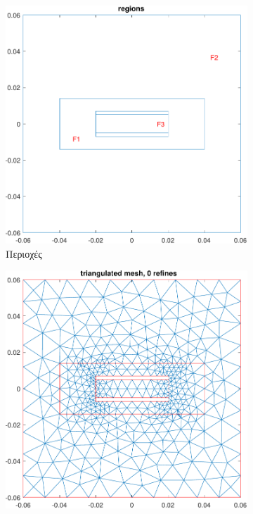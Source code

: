 \documentclass[10pt, letterpaper]{article}
\begin{document}
\begin{figure}[h!]
  \centering
  \begin{subfigure}[b]{0.3\textwidth}
      \centering
      \includegraphics[width=\textwidth]{capacitor_regions.pdf}
      \caption{Περιοχές}
      \label{fig:capacitor_regions}
  \end{subfigure}
  \hfill
  \begin{subfigure}[b]{0.3\textwidth}
      \centering
      \includegraphics[width=\textwidth]{capacitor_mesh_0.pdf}

\end{subfigure}
\end{figure}
\end{document}
